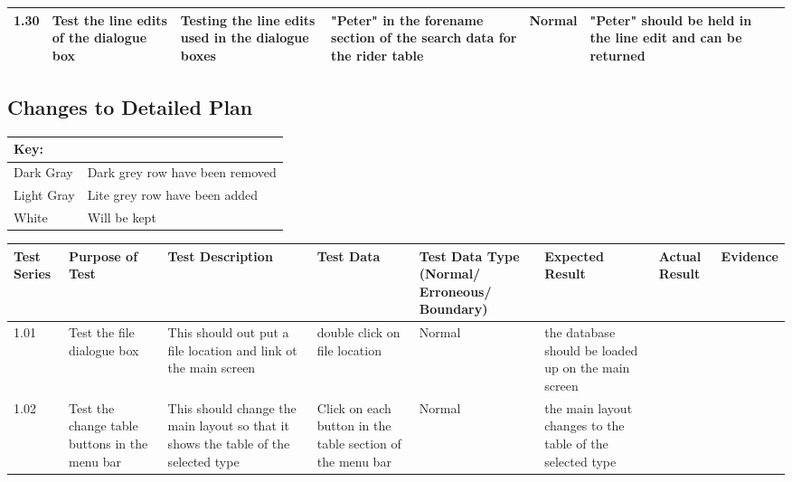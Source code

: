 \begin{landscape}
\begin{center}
\begin{longtable}{|p{1.5cm}|p{2.5cm}|p{2.5cm}|p{2cm}|p{2cm}|p{2cm}|p{2cm}|p{2cm}|}
        1.30 & Test the line edits of the dialogue box & Testing the line edits used in the dialogue boxes & "Peter" in the forename section of the search data for the rider table & Normal & "Peter" should be held in the line edit and can be returned & & \\ \hline 
    \end{longtable}
\end{center}



\subsection{Changes to Detailed Plan}

\begin{tabular}{|l|l|}
\hline
Key: & \\ \hline
\rowcolor{DarkGray} Dark Gray & Dark grey row have been removed \\ \hline
\rowcolor{LiteGray} Light Gray & Lite grey row have been added\\ \hline
White & Will be kept \\ \hline

\end{tabular}


\begin{center}
    \begin{longtable}{|p{1.5cm}|p{2.5cm}|p{2.5cm}|p{2cm}|p{2cm}|p{2cm}|p{2cm}|p{2cm}|}
        \hline
        \textbf{Test Series} & \textbf{Purpose of Test} & \textbf{Test Description} & \textbf{Test Data} & \textbf{Test Data Type (Normal/ Erroneous/ Boundary)} & \textbf{Expected Result} & \textbf{Actual Result} & \textbf{Evidence}\\ \hline
        1.01 & Test the file dialogue box & This should out put a file location and link ot the main screen & double click on file location & Normal & the database should be loaded up on the main screen &  &  \\ \hline
        
        1.02 & Test the change table buttons in the menu bar  & This should change the main layout so that it shows the table of the selected type & Click on each button in the table section of the menu bar & Normal & the main layout changes to the table of the selected type & & \\ \hline
        

\end{longtable}
\end{center}
\end{landscape}
